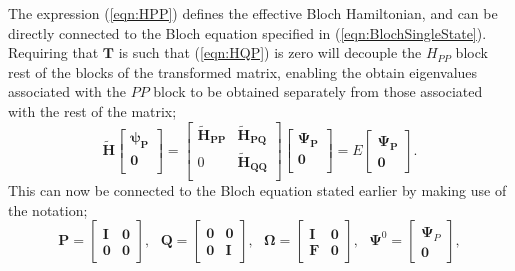 \documentclass[12pt]{article}
\begin{document}
\noindent The expression (\ref{eqn:HPP}) defines the effective Bloch Hamiltonian, and can be directly connected to the Bloch equation
specified in (\ref{eqn:BlochSingleState}). Requiring that $\mathbf{T}$ is such that (\ref{eqn:HQP}) is zero will decouple the
$H_{PP}$ block rest of the blocks of the transformed matrix, enabling the obtain eigenvalues associated with the $PP$ block to be obtained
separately from those associated with the rest of the matrix;
\begin{equation}
\mathbf{\tilde{H}}
\begin{bmatrix}
 \boldsymbol{\psi_{P}} \\ 
 \mathbf{0} \\ 
\end{bmatrix}
=
\begin{bmatrix}
 \mathbf{\tilde{H}_{PP}} & \mathbf{\tilde{H}_{PQ}} \\ 
 0                       & \mathbf{\tilde{H}_{QQ}} \\ 
\end{bmatrix} 
\begin{bmatrix}
 \boldsymbol{\Psi_{P}} \\ 
 \mathbf{0} \\ 
\end{bmatrix} 
= E 
\begin{bmatrix}
\boldsymbol{\Psi_{P}} \\ 
\mathbf{0} 
\end{bmatrix}.
\label{eqn:TransEvalEqnSimple}
\end{equation}
This can now be connected to the Bloch equation stated earlier by making use of the notation;
\begin{equation}
\mathbf{P} =  
\begin{bmatrix}
\mathbf{I} & \mathbf{0} \\ 
\mathbf{0} & \mathbf{0} 
\end{bmatrix},
\text{ \ \ \ }
\mathbf{Q} =  
\begin{bmatrix}
\mathbf{0} & \mathbf{0} \\ 
\mathbf{0} & \mathbf{I} 
\end{bmatrix},
\text{ \ \ \ }
\boldsymbol{\Omega} =  
\begin{bmatrix}
\mathbf{I} & \mathbf{0} \\ 
\mathbf{F} & \mathbf{0} 
\end{bmatrix},
\text{ \ \ \ }
\boldsymbol{\Psi}^{0} =
\begin{bmatrix}
\boldsymbol{\Psi}_{P} \\
\mathbf{0} 
\end{bmatrix},
\end{equation}
\end{document}

